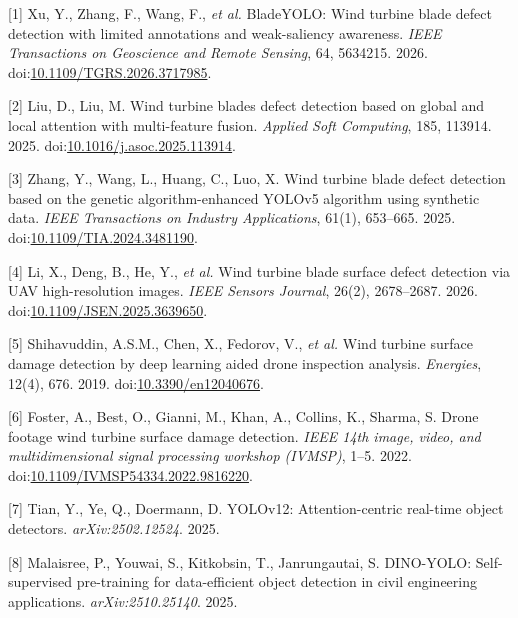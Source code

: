 \documentclass[
  10pt,
]{article}
\newlength{\cslhangindent}
\newenvironment{CSLReferences}[2] %
 {\begin{list}{}{%
  \setlength{\itemindent}{0pt}
  \setlength{\leftmargin}{0pt}
  \setlength{\parsep}{0pt}
  \ifodd #1
   \setlength{\leftmargin}{\cslhangindent}
   \setlength{\itemindent}{-1\cslhangindent}
  \fi
  \setlength{\itemsep}{#2\baselineskip}}}
 {\end{list}}
\begin{document}
\protect{}\label{refs}
\begin{CSLReferences}{0}{0}
{[}1{]} Xu, Y., Zhang, F., Wang, F., \emph{et al.} {BladeYOLO}: Wind
turbine blade defect detection with limited annotations and
weak-saliency awareness. \emph{IEEE Transactions on Geoscience and
Remote Sensing}, 64, 5634215. 2026.
doi:\href{https://doi.org/10.1109/TGRS.2026.3717985}{10.1109/TGRS.2026.3717985}.

{[}2{]} Liu, D., Liu, M. Wind turbine blades defect detection based on
global and local attention with multi-feature fusion. \emph{Applied Soft
Computing}, 185, 113914. 2025.
doi:\href{https://doi.org/10.1016/j.asoc.2025.113914}{10.1016/j.asoc.2025.113914}.

{[}3{]} Zhang, Y., Wang, L., Huang, C., Luo, X. Wind turbine blade
defect detection based on the genetic algorithm-enhanced {YOLOv5}
algorithm using synthetic data. \emph{IEEE Transactions on Industry
Applications}, 61(1), 653--665. 2025.
doi:\href{https://doi.org/10.1109/TIA.2024.3481190}{10.1109/TIA.2024.3481190}.

{[}4{]} Li, X., Deng, B., He, Y., \emph{et al.} Wind turbine blade
surface defect detection via {UAV} high-resolution images. \emph{IEEE
Sensors Journal}, 26(2), 2678--2687. 2026.
doi:\href{https://doi.org/10.1109/JSEN.2025.3639650}{10.1109/JSEN.2025.3639650}.

{[}5{]} Shihavuddin, A.S.M., Chen, X., Fedorov, V., \emph{et al.} Wind
turbine surface damage detection by deep learning aided drone inspection
analysis. \emph{Energies}, 12(4), 676. 2019.
doi:\href{https://doi.org/10.3390/en12040676}{10.3390/en12040676}.

{[}6{]} Foster, A., Best, O., Gianni, M., Khan, A., Collins, K., Sharma,
S. Drone footage wind turbine surface damage detection. \emph{IEEE 14th
image, video, and multidimensional signal processing workshop (IVMSP)},
1--5. 2022.
doi:\href{https://doi.org/10.1109/IVMSP54334.2022.9816220}{10.1109/IVMSP54334.2022.9816220}.

{[}7{]} Tian, Y., Ye, Q., Doermann, D. {YOLOv12}: Attention-centric
real-time object detectors. \emph{arXiv:2502.12524}. 2025.

{[}8{]} Malaisree, P., Youwai, S., Kitkobsin, T., Janrungautai, S.
{DINO-YOLO}: Self-supervised pre-training for data-efficient object
detection in civil engineering applications. \emph{arXiv:2510.25140}.
2025.


\end{CSLReferences}
\end{document}
